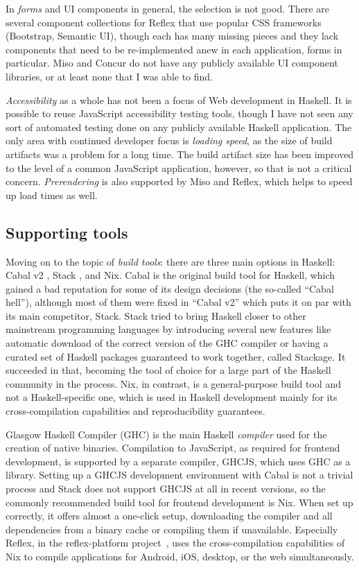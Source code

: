 \documentclass[english,zadani,odsaz]{fitthesis}
\begin{document}
In \emph{forms} and UI components in general, the selection is not good. There are
several component collections for Reflex that use popular CSS frameworks
(Bootstrap, Semantic UI), though each has many missing pieces and they lack
components that need to be re-implemented anew in each application, forms in
particular. Miso and Concur do not have any publicly available UI component
libraries, or at least none that I was able to find.

\emph{Accessibility} as a whole has not been a focus of Web development in Haskell. It
is possible to reuse JavaScript accessibility testing tools, though I have not
seen any sort of automated testing done on any publicly available Haskell
application. The only area with continued developer focus is \emph{loading speed}, as
the size of build artifacts was a problem for a long time. The build artifact
size has been improved to the level of a common JavaScript application, however,
so that is not a critical concern. \emph{Prerendering} is also supported by Miso and
Reflex, which helps to speed up load times as well.

\subsection{Supporting tools}
\label{sec:orgb95b3ad}
Moving on to the topic of \emph{build tools}: there are three main options in Haskell:
Cabal v2 \cite{cabal}, Stack \cite{stack}, and Nix. Cabal is the original build tool
for Haskell, which gained a bad reputation for some of its design decisions (the
so-called ``Cabal hell''), although most of them were fixed in ``Cabal v2'' which
puts it on par with its main competitor, Stack. Stack tried to bring Haskell
closer to other mainstream programming languages by introducing several new
features like automatic download of the correct version of the GHC compiler or
having a curated set of Haskell packages guaranteed to work together, called
Stackage. It succeeded in that, becoming the tool of choice for a large part of
the Haskell community in the process. Nix, in contrast, is a general-purpose
build tool and not a Haskell-specific one, which is used in Haskell development
mainly for its cross-compilation capabilities and reproducibility guarantees.

Glasgow Haskell Compiler (GHC) is the main Haskell \emph{compiler} used for the
creation of native binaries. Compilation to JavaScript, as required for frontend
development, is supported by a separate compiler, GHCJS, which uses GHC as a
library. Setting up a GHCJS development environment with Cabal is not a trivial
process and Stack does not support GHCJS at all in recent versions, so the
commonly recommended build tool for frontend development is Nix. When set up
correctly, it offers almost a one-click setup, downloading the compiler and all
dependencies from a binary cache or compiling them if unavailable. Especially
Reflex, in the reflex-platform project~\cite{reflex-platform}, uses the
cross-compilation capabilities of Nix to compile applications for Android, iOS,
desktop, or the web simultaneously.
\end{document}
